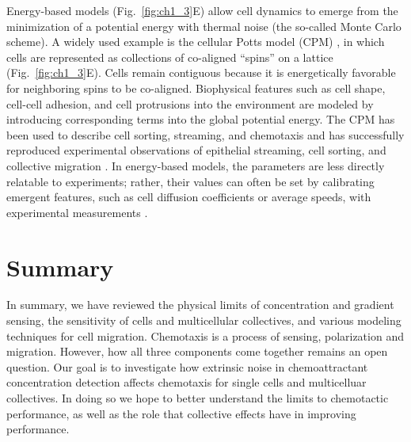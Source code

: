 Energy-based models (Fig.\ \ref{fig:ch1_3}E) allow cell dynamics to emerge from the minimization of a potential energy with thermal noise (the so-called Monte Carlo scheme). A widely used example is the cellular Potts model (CPM) \cite{graner1992simulation, swat2012multi}, in which cells are represented as collections of co-aligned ``spins'' on a lattice (Fig.\ \ref{fig:ch1_3}E). Cells remain contiguous because it is energetically favorable for neighboring spins to be co-aligned. Biophysical features such as cell shape, cell-cell adhesion, and cell protrusions into the environment are modeled by introducing corresponding terms into the global potential energy.
The CPM has been used to describe cell sorting, streaming, and chemotaxis \cite{maree2007cellular} and has successfully reproduced experimental observations of epithelial streaming, cell sorting, and collective migration \cite{kabla2012collective,maree2007cellular,szabo2010collective}.
In energy-based models, the parameters are less directly relatable to experiments; rather, their values can often be set by calibrating emergent features, such as cell diffusion coefficients or average speeds, with experimental measurements \cite{szabo2010collective}.


\section{Summary}

In summary, we have reviewed the physical limits of concentration and gradient sensing, the sensitivity of cells and multicellular collectives, and various modeling techniques for cell migration. Chemotaxis is a process of sensing, polarization and migration. However, how all three components come together remains an open question. Our goal is to investigate how extrinsic noise in chemoattractant concentration detection affects chemotaxis for single cells and multicelluar collectives. In doing so we hope to better understand the limits to chemotactic performance, as well as the role that collective effects have in improving performance.




